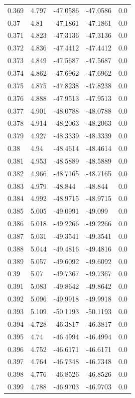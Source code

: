 \begin{table}[H]
\begin{tabular}{lllll}
0.369 & 4.797 & -47.0586 & -47.0586 & 0.0 \\
0.37 & 4.81 & -47.1861 & -47.1861 & 0.0 \\
0.371 & 4.823 & -47.3136 & -47.3136 & 0.0 \\
0.372 & 4.836 & -47.4412 & -47.4412 & 0.0 \\
0.373 & 4.849 & -47.5687 & -47.5687 & 0.0 \\
0.374 & 4.862 & -47.6962 & -47.6962 & 0.0 \\
0.375 & 4.875 & -47.8238 & -47.8238 & 0.0 \\
0.376 & 4.888 & -47.9513 & -47.9513 & 0.0 \\
0.377 & 4.901 & -48.0788 & -48.0788 & 0.0 \\
0.378 & 4.914 & -48.2063 & -48.2063 & 0.0 \\
0.379 & 4.927 & -48.3339 & -48.3339 & 0.0 \\
0.38 & 4.94 & -48.4614 & -48.4614 & 0.0 \\
0.381 & 4.953 & -48.5889 & -48.5889 & 0.0 \\
0.382 & 4.966 & -48.7165 & -48.7165 & 0.0 \\
0.383 & 4.979 & -48.844 & -48.844 & 0.0 \\
0.384 & 4.992 & -48.9715 & -48.9715 & 0.0 \\
0.385 & 5.005 & -49.0991 & -49.099 & 0.0 \\
0.386 & 5.018 & -49.2266 & -49.2266 & 0.0 \\
0.387 & 5.031 & -49.3541 & -49.3541 & 0.0 \\
0.388 & 5.044 & -49.4816 & -49.4816 & 0.0 \\
0.389 & 5.057 & -49.6092 & -49.6092 & 0.0 \\
0.39 & 5.07 & -49.7367 & -49.7367 & 0.0 \\
0.391 & 5.083 & -49.8642 & -49.8642 & 0.0 \\
0.392 & 5.096 & -49.9918 & -49.9918 & 0.0 \\
0.393 & 5.109 & -50.1193 & -50.1193 & 0.0 \\
0.394 & 4.728 & -46.3817 & -46.3817 & 0.0 \\
0.395 & 4.74 & -46.4994 & -46.4994 & 0.0 \\
0.396 & 4.752 & -46.6171 & -46.6171 & 0.0 \\
0.397 & 4.764 & -46.7348 & -46.7348 & 0.0 \\
0.398 & 4.776 & -46.8526 & -46.8526 & 0.0 \\
0.399 & 4.788 & -46.9703 & -46.9703 & 0.0 \\

\end{tabular}
\end{table}

